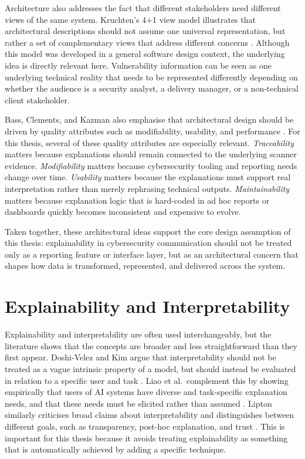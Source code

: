 Architecture also addresses the fact that different stakeholders need different views of the same system. Kruchten’s 4+1 view model illustrates that architectural descriptions should not assume one universal representation, but rather a set of complementary views that address different concerns \cite{kruchten1995viewmodel}. Although this model was developed in a general software design context, the underlying idea is directly relevant here. Vulnerability information can be seen as one underlying technical reality that needs to be represented differently depending on whether the audience is a security analyst, a delivery manager, or a non-technical client stakeholder.

Bass, Clements, and Kazman also emphasise that architectural design should be driven by quality attributes such as modifiability, usability, and performance \cite{bass2012software}. For this thesis, several of these quality attributes are especially relevant. \textit{Traceability} matters because explanations should remain connected to the underlying scanner evidence. \textit{Modifiability} matters because cybersecurity tooling and reporting needs change over time. \textit{Usability} matters because the explanations must support real interpretation rather than merely rephrasing technical outputs. \textit{Maintainability} matters because explanation logic that is hard-coded in ad hoc reports or dashboards quickly becomes inconsistent and expensive to evolve.

Taken together, these architectural ideas support the core design assumption of this thesis: explainability in cybersecurity communication should not be treated only as a reporting feature or interface layer, but as an architectural concern that shapes how data is transformed, represented, and delivered across the system.

\section{Explainability and Interpretability}

Explainability and interpretability are often used interchangeably, but the literature shows that the concepts are broader and less straightforward than they first appear. Doshi-Velez and Kim argue that interpretability should not be treated as a vague intrinsic property of a model, but should instead be evaluated in relation to a specific user and task \cite{doshivelez2017rigorous}. Liao et al.\ complement this by showing empirically that users of AI systems have diverse and task-specific explanation needs, and that these needs must be elicited rather than assumed \cite{liao2020questioning}. Lipton similarly criticises broad claims about interpretability and distinguishes between different goals, such as transparency, post-hoc explanation, and trust \cite{lipton2018mythos}. This is important for this thesis because it avoids treating explainability as something that is automatically achieved by adding a specific technique.

